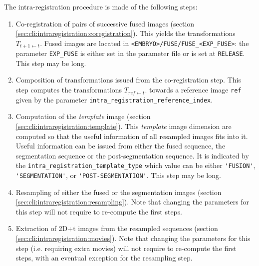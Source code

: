 The intra-registration procedure is made of the following steps:
\begin{enumerate}

\item Co-registration of pairs of successive fused images (section \ref{sec:cli:intraregistration:coregistration}). This yields the transformations $T_{t+1 \leftarrow t}$. Fused images are located in \verb|<EMBRYO>/FUSE/FUSE_<EXP_FUSE>|: the parameter \verb|EXP_FUSE| is either set in the parameter file or is set at \verb|RELEASE|. This step may be long.

\item Composition of transformations issued from the co-registration  step. This step computes the transformations $T_{ref \leftarrow t}$. towards a reference image \verb|ref| given by the parameter \verb|intra_registration_reference_index|.

\item Computation of the \textit{template} image (section \ref{sec:cli:intraregistration:template}). This \textit{template} image dimension are computed so that the useful information of all resampled images fits into it. Useful information can be issued from either the fused sequence, the segmentation sequence or the post-segmentation sequence. It is indicated by the \verb|intra_registration_template_type| which value can be either \verb|'FUSION'|,  \verb|'SEGMENTATION'|, or \verb|'POST-SEGMENTATION'|. This step may be long.

\item Resampling of either the fused or the segmentation images  (section \ref{sec:cli:intraregistration:resampling}). Note that changing the parameters for this step will not require to re-compute the first steps.

\item Extraction of 2D+t images from the resampled sequences (section \ref{sec:cli:intraregistration:movies}). Note that changing the parameters for this step (i.e. requiring extra movies) will not require to re-compute the first steps, with an eventual exception for the resampling step.

\end{enumerate}


